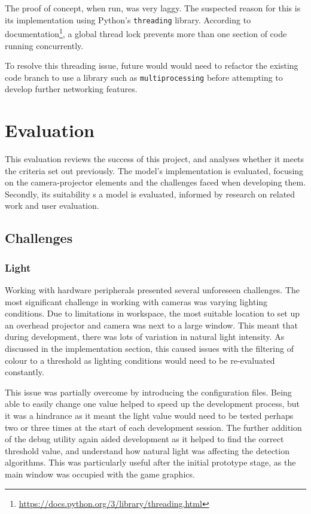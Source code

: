\documentclass[12pt]{article}
\begin{document}
The proof of concept, when run, was very laggy. 
The suspected reason for this is its implementation using Python's \texttt{threading} library. 
According to documentation\footnote{\url{https://docs.python.org/3/library/threading.html}}, a global thread lock prevents more than one section of code running concurrently. 

To resolve this threading issue, future would would need to refactor the existing code branch to use a library such as \texttt{multiprocessing} before attempting to develop further networking features.
 
\section{Evaluation} 
This evaluation reviews the success of this project, and analyses whether it meets the criteria set out previously. 
The model's implementation is evaluated, focusing on the camera-projector elements and the challenges faced when developing them. Secondly, its suitability s a model is evaluated, informed by research on related work and user evaluation.

\subsection{Challenges}
\subsubsection{Light}
Working with hardware peripherals presented several unforeseen challenges. 
The most significant challenge in working with cameras was varying lighting conditions. 
Due to limitations in workspace, the most suitable location to set up an overhead projector and camera was next to a large window. 
This meant that during development, there was lots of variation in natural light intensity. 
As discussed in the implementation section, this caused issues with the filtering of colour to a threshold as lighting conditions would need to be re-evaluated constantly. 

This issue was partially overcome by introducing the configuration files. 
Being able to easily change one value helped to speed up the development process, but it was a hindrance as it meant the light value would need to be tested perhaps two or three times at the start of each development session. 
The further addition of the debug utility again aided development as it helped to find the correct threshold value, and understand how natural light was affecting the detection algorithms. 
This was particularly useful after the initial prototype stage, as the main window was occupied with the game graphics.
\end{document}
